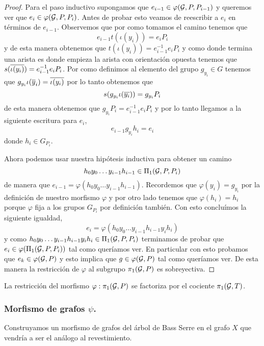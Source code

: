 \documentclass[tesis.tex]{subfiles}
\newcommand{\cG}{ {\cal G} }
\begin{document}
\begin{proof}
	Para el paso inductivo supongamos que $e_{i-1} \in \varphi(\cG, P, P_{i-1})$ y queremos ver que $e_i \in \varphi(\cG, P, P_{i})$.
	Antes de probar esto veamos de reescribir a $e_i$ en términos de $e_{i-1}$.
	Observemos que por como tomamos el camino tenemos que
	\[
		e_{i-1} t(\iota (y_i)) = e_i P_i 
	\]
	y de esta manera obtenemos que $t(\iota (y_i)) = e_{i-1}^{-1} e_i P_i$ y como donde termina una arista es donde empieza la arista con orientación opuesta tenemos que $s(\overline{\iota(y_i)}) = e_{i-1}^{-1} e_i P_i$. 
	Por como definimos al elemento del grupo $g_{y_i} \in G$ tenemos que $g_{y_i} \iota (\overline y_i) = \overline{\iota (y_i)}$ por lo tanto obtenemos que 
	\[
		s(g_{y_i} \iota (\overline{y_i})) = g_{y_i} P_i
	\]
	de esta manera obtenemos que $g_{y_i} P_i = e_{i-1}^{-1} e_i P_i$ y por lo tanto llegamos a la siguiente escritura para $e_i$,
	\begin{equation*}
		e_{i-1}g_{y_i} h_i  = e_i 
	\end{equation*}
	donde $h_i \in G_{P_i}$. 
	
	Ahora podemos usar nuestra hipótesis inductiva para obtener un camino 
	\[
		h_0y_0 \dots y_{i-1}h_{i-1} \in \Pi_1(\cG, P, P_i)
	\]
	de manera que $e_{i-1} =  \varphi(h_0y_0 \dots y_{i-1}h_{i-1})$. 
	Recordemos que $\varphi(y_i) = g_{y_i}$ por la definición de nuestro morfismo $\varphi$ y por otro lado tenemos que $\varphi(h_i) = h_i$ porque $\varphi$ fija a los grupos $G_{P_i}$ por definición también.
	Con esto concluímos la siguiente igualdad,
	\[
		e_i = \varphi(h_0y_0 \dots y_{i-1}h_{i-1} y_i h_i)
	\]
	y como $h_0y_0 \dots y_{i-1}h_{i-1} y_i h_i \in \Pi_1(\cG, P, P_i)$ terminamos de probar que $e_{i} \in \varphi(\Pi_1(\cG, P, P_i))$ tal como queríamos ver. 
	En particular con esto probamos que $e_k \in \varphi(\cG, P)$ y esto implica que $g \in \varphi(\cG, P)$ tal como queríamos ver.
	De esta manera la restricción de $\varphi$ al subgrupo $\pi_1(\cG, P)$ es sobreyectiva.
	
		
\end{proof}

\begin{coro}
	La restricción del morfismo $\varphi: \pi_1(\cG, P)$ se factoriza por el cociente $\pi_1(\cG, T)$.
\end{coro}


\subsubsection{Morfismo de grafos $\psi$.}

Construyamos un morfismo de grafos del árbol de Bass Serre en el grafo $X$ que vendría a ser el análogo al revestimiento.
\end{document}
